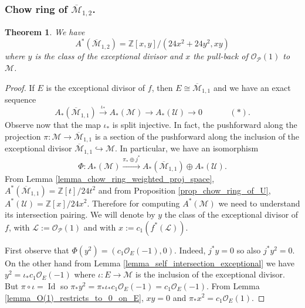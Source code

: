\documentclass[11pt]{amsart}
\newtheorem{theorem}{Theorem}[section]
\theoremstyle{definition}
\theoremstyle{remark}
\newcommand{\calO}{\mathcal O}
\newcommand{\calM}{\mathcal M}
\newcommand{\calL}{\mathcal L}
\newcommand{\calU}{\mathcal U}
\newcommand{\calP}{\mathcal P}
\begin{document}
\subsubsection{Chow ring of $\overline{\calM}_{1,2}$.}
\begin{theorem}\label{thm_chow_ring_m12_bar}
We have $$A^*(\overline{\calM}_{1,2}) = \mathbb{Z}[x,y]/(24x^2+24y^2,xy)$$
where $y$ is the class of the exceptional divisor and $x$ the pull-back of $\calO_\calP(1)$ to $\calM$.
\end{theorem}
\begin{proof}
If $E$ is the exceptional divisor of $f$, then $E \cong \overline{\calM}_{1,1}$ and we have an exact sequence  
$$A_*(\overline{\calM}_{1,1}) \xrightarrow{\iota_*} A_*(\calM) \to A_*(\calU) \to 0 \text{ } \text{ } \text{ } \text{ } \text{ } (\ast).$$
Observe now that 
the map $\iota_*$ is split injective. In fact, the pushforward along the projection $\pi:\calM \to\overline{\calM}_{1,1}$ is a section of the pushforward along the inclusion of the exceptional divisor $\overline{\calM}_{1,1}\hookrightarrow \calM$.
In particular, we have an isomorphism $$\Phi:A_*(\calM) \xrightarrow{\pi_* \oplus j^*}  A_*(\overline{\calM}_{1,1}) \oplus A_*(\calU).$$
From Lemma \ref{lemma_chow_ring_weighted_proj_space}, $A^*(\overline{\calM}_{1,1}) = \mathbb{Z}[t]/24t^2$ and from Proposition \ref{prop_chow_ring_of_U}, $A^*(\calU) = \mathbb{Z}[x]/24x^2$.
 Therefore
for computing $A^*(\calM)$ we need to understand its intersection pairing. We will denote by $y$ the class of the exceptional divisor of $f$, with $\calL :=\calO_\calP(1)$ and with $x:= c_1(f^*(\calL))$.

First observe that $ \Phi(y^2) = (c_1\calO_{E}(-1), 0)$. Indeed, $j^*y = 0$ so also $j^*y^2 = 0$. On the other hand from Lemma \ref{lemma_self_intersection_exceptional} we have $y^2 = \iota_*c_1\calO_{E}(-1)$ where $\iota:E\to \calM$ is the inclusion of the exceptional divisor. But $\pi\circ \iota = \operatorname{Id}$ so $\pi_*y^2 =\pi_* \iota_*c_1\calO_{E}(-1) = c_1\calO_{E}(-1).$
From Lemma \ref{lemma_O(1)_restricts_to_0_on_E}, $xy = 0$ and $\pi_*x^2 = c_1\calO_{E}(1)$.


\end{proof}
\end{document}
